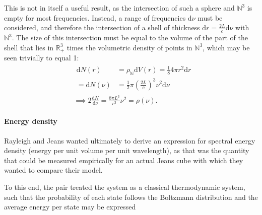 \documentclass{article}
\begin{document}
This is not in itself a useful result, as the intersection of such a sphere and $\mathbb{N}^3$ is empty for most frequencies. Instead, a range of frequencies $\mathrm{d}\nu$ must be considered, and therefore the intersection of a shell of thickness $\mathrm{d}r = \frac{2L}{c}\mathrm{d}\nu$ with $\mathbb{N}^3$. The size of this intersection must be equal to the volume of the part of the shell that lies in $\mathbb{R}_+^3$ times the volumetric density of points in $\mathbb{N}^3$, which may be seen trivially to equal 1:
\begin{equation*}
    \begin{aligned}
        &\begin{aligned}
            \mathrm{d}N(r) &= \rho_\mathbb{N}\mathrm{d}V(r) = \frac{1}{8}4\pi r^2 \mathrm{d}r\\
        = \mathrm{d}N(\nu)&=\frac{1}{2}\pi \left(\frac{2L}{c} \right)^3\nu^2\mathrm{d}\nu
        \end{aligned}\\
        &\implies 2\frac{\mathrm{d}N}{\mathrm{d}\nu} = \frac{8\pi L^3}{c^3}\nu^2 = \rho(\nu).
    \end{aligned}
\end{equation*}

\paragraph{Energy density}
Rayleigh and Jeans wanted ultimately to derive an expression for spectral energy density (energy per unit volume per unit wavelength), as that was the quantity that could be measured empirically for an actual Jeans cube with which they wanted to compare their model.

To this end, the pair treated the system as a classical thermodynamic system, such that the probability of each state follows the Boltzmann distribution and the average energy per state may be expressed
\end{document}
